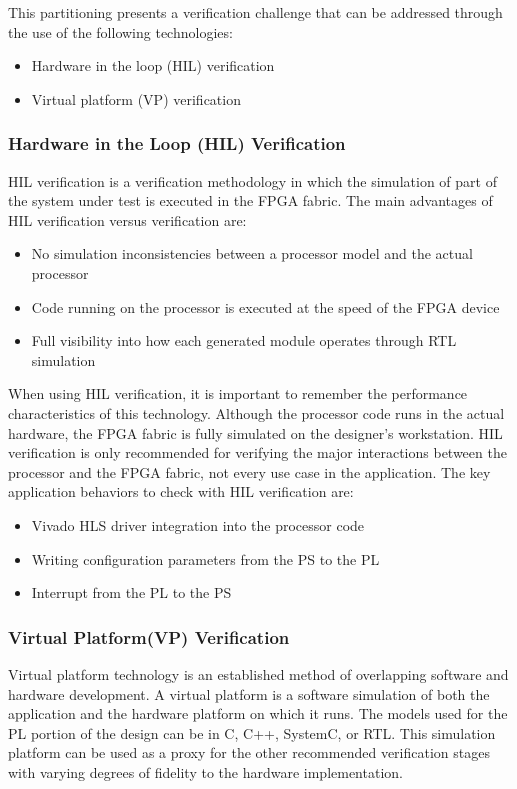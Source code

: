 This partitioning presents a verification
challenge that can be addressed through the use of the following technologies:
\begin{itemize}
  \item Hardware in the loop (HIL) verification
  \item Virtual platform (VP) verification
\end{itemize}

\subsubsection{Hardware in the Loop (HIL) Verification}
HIL verification is a verification methodology in which the simulation of part of the system
under test is executed in the FPGA fabric. The main advantages of HIL verification versus verification are:
\begin{itemize}
  \item No simulation inconsistencies between a processor model and the actual processor
  \item Code running on the processor is executed at the speed of the FPGA device
  \item Full visibility into how each generated module operates through RTL simulation
\end{itemize}

When using HIL verification, it is important to remember the performance characteristics of
this technology. Although the processor code runs in the actual hardware, the FPGA fabric
is fully simulated on the designer’s workstation. HIL verification is
only recommended for verifying the major interactions between the processor and the
FPGA fabric, not every use case in the application. The key application behaviors to check
with HIL verification are:
\begin{itemize}
  \item Vivado HLS driver integration into the processor code
  \item Writing configuration parameters from the PS to the PL
  \item Interrupt from the PL to the PS
\end{itemize}


\subsubsection{Virtual Platform(VP) Verification}
Virtual platform technology is an established method of overlapping software and
hardware development. A virtual platform is a
software simulation of both the application and the hardware platform on which it runs. The
models used for the PL portion of the design can be in C, C++, SystemC, or RTL. This
simulation platform can be used as a proxy for the other recommended verification stages
with varying degrees of fidelity to the hardware implementation.

